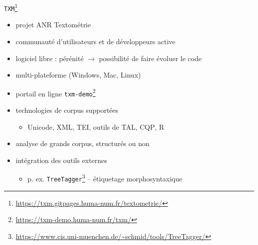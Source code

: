 \documentclass[xetex,xcolor={table,usenames,dvipsnames}]{beamer}
\begin{document}
\begin{frame}{\texttt{TXM}\footnote{\url{https://txm.gitpages.huma-num.fr/textometrie/}}}
\begin{itemize}
	\item projet \textsc{ANR} \og{}Textométrie\fg{}
	\item communauté d'utilisateurs et de développeurs active
	\item logiciel libre : pérénité $\rightarrow$ possibilité de faire évoluer le code
	\item multi-plateforme (Windows, Mac, Linux)
	\item portail en ligne \texttt{txm-demo}\footnote{\url{https://txm-demo.huma-num.fr/txm/}}
	\item technologies de corpus supportées
	\begin{itemize}
		\item Unicode, \textsc{XML}, \textsc{TEI}, outils de \textsc{TAL}, \textsc{CQP}, \textsc{R}
		\end{itemize}
	\item analyse de grands corpus, structurés ou non
	\item intégration des outils externes 
	\begin{itemize}
		\item p. ex. \texttt{TreeTagger}\footnote{\url{https://www.cis.uni-muenchen.de/~schmid/tools/TreeTagger/}} -- étiquetage morphosyntaxique
		\end{itemize}
\end{itemize}
\end{frame}
\end{document}
